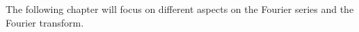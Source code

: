 The following chapter will focus on different aspects on the Fourier series and the Fourier transform.
